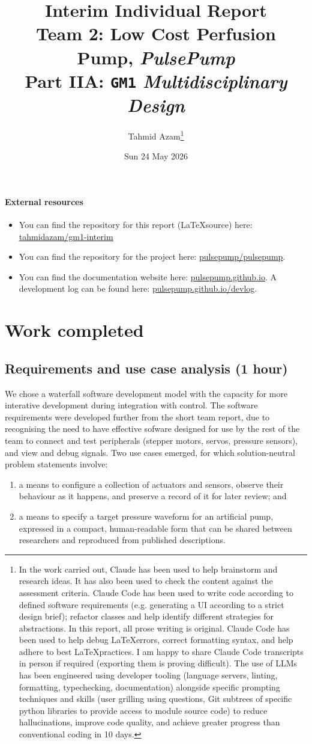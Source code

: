 \documentclass[10pt, a4paper]{article}
\title{
    Interim Individual Report\\[0.5em]
    \Large Team 2: Low Cost Perfusion Pump, \textit{PulsePump}\\[0.25em]
    \normalsize Part IIA: \texttt{GM1} \textit{Multidisciplinary Design}
}
\author[1]{Tahmid Azam\footnote{
In the work carried out, Claude has been used to help brainstorm and research ideas. It has also been used to check the content against the assessment criteria.
Claude Code has been used to write code according to defined software requirements (e.g. generating a UI according to a strict design brief); refactor classes and help identify different strategies for abstractions.
In this report, all prose writing is original.
Claude Code has been used to help debug \LaTeX errors, correct formatting syntax, and help adhere to best \LaTeX practices.
I am happy to share Claude Code transcripts in person if required (exporting them is proving difficult).
The use of LLMs has been engineered using developer tooling (language servers, linting, formatting, typechecking, documentation) alongside specific prompting techniques and skills (user grilling using questions, Git subtrees of specific python libraries to provide access to module source code) to reduce hallucinations, improve code quality, and achieve greater progress than conventional coding in 10 days.}}
\affil[ ]{{\normalsize with teammates Luca Buxton, India Henry, Lonnie McKiernan, and Lucy Payne}}
\affil[ ]{{\normalsize mentored by Dr. Peter Long and Prof. Athina E. Markaki}}
\affil[ ]{{\small}}
\affil[1]{Department of Engineering, University of Cambridge}
\date{Sun 24 May 2026}
\begin{document}
\maketitle

\pagestyle{fancy}
\fancyhf{}
\fancyfoot[C]{\thepage}
\thispagestyle{plain}

\paragraph{External resources}
\begin{itemize}
  \item You can find the repository for this report (\LaTeX \;source) here: \underline{\href{https://github.com/tahmidazam/gm1-interim}{tahmidazam/gm1-interim}}
  \item You can find the repository for the project here: \underline{\href{https://github.com/PulsePump/pulsepump}{pulsepump/pulsepump}}.
  \item You can find the documentation website here: \underline{\href{https://pulsepump.github.io/pulsepump/}{pulsepump.github.io}}. A development log can be found here: \underline{\href{https://pulsepump.github.io/pulsepump/devlog/index.html}{pulsepump.github.io/devlog}}.
\end{itemize}

\newpage

\section{Work completed}

\subsection{Requirements and use case analysis (1 hour)}

We chose a waterfall software development model with the capacity for more interative development during integration with control.
The software requirements were developed further from the short team report, due to recognising the need to have effective sofware designed for use by the rest of the team to connect and test peripherals (stepper motors, servos, pressure sensors), and view and debug signals.
Two use cases emerged, for which solution-neutral problem statements involve:

\begin{enumerate}[noitemsep]
  \item a means to configure a collection of actuators and sensors, observe their behaviour as it happens, and preserve a record of it for later review; and
  \item a means to specify a target pressure waveform for an artificial pump, expressed in a compact, human-readable form that can be shared between researchers and reproduced from published descriptions.
\end{enumerate}
\end{document}
